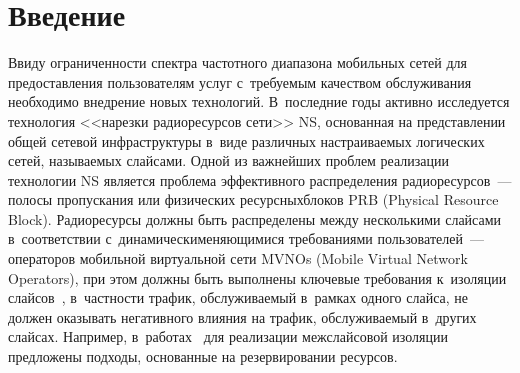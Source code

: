 
  
\vspace*{2pt}



\thispagestyle{headings}

\begin{multicols}{2}

\label{st\stat}

\section{Введение}

Ввиду ограниченности спектра частотного диапазона мобильных сетей для 
предоставления пользователям услуг с~требуемым качеством обслуживания необходимо 
внедрение новых технологий. В~последние годы активно исследуется технология 
<<нарезки радиоресурсов сети>> NS, основанная на представлении 
общей сетевой инфраструктуры в~виде различных настраиваемых логических сетей, 
называемых слайсами. Одной из \mbox{важнейших} проб\-лем реализации технологии NS 
является проб\-ле\-ма эффективного распределения радиоресурсов~--- полосы 
пропускания или физических ресурсных\linebreak блоков PRB (Physical Resource Block). 
Радиоре\-сурсы должны быть распределены между несколькими слайсами в~соответствии 
с~динамически\linebreak меняющимися требованиями пользователей~--- операторов 
мобильной виртуальной сети MVNOs (Mobile Virtual Network Operators), при этом 
долж\-ны быть выполнены ключевые требования к~изоляции слайсов~\cite{3gpp.21.916, 3gpp.22.864}, 
в~част\-ности трафик, об\-слу\-жи\-ва\-емый в~рамках одного слайса, не должен оказывать негативного влияния на трафик, 
об\-слу\-жи\-ва\-емый в~других слайсах. Например, в~работах~\cite{3gpp.28.554, Yarkina2022} для реализации межслайсовой изоляции 
предложены подходы, основанные на резервировании ресурсов.


\end{multicols}
